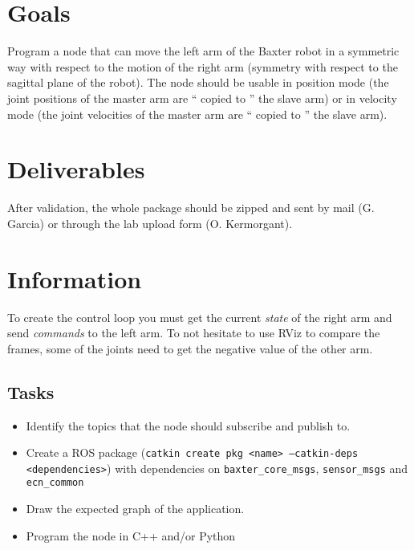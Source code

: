 \documentclass{ecnreport}
\author{G. Garcia, O. Kermorgant}
\begin{document}


\section{Goals}

Program a node that can move the left arm of the Baxter robot in a symmetric way with respect to
the motion of the right arm (symmetry with respect to the sagittal plane of the robot).
The node should be usable in position mode (the joint positions of the master arm are `` copied to ''
the slave arm) or in velocity mode (the joint velocities of the master arm are `` copied to '' the slave
arm).

\section{Deliverables}

After validation, the whole package should be zipped and sent by mail (G. Garcia) or through the lab upload form (O. Kermorgant).

\section{Information}

To create the control loop you must get the current \emph{state} of the right arm and send \emph{commands} to 
the left arm. To not hesitate to use RViz to compare the frames, some of the joints need to get the negative
value of the other arm.

\subsection{Tasks}

\begin{itemize}
\item Identify the topics that the node should subscribe and publish to.
 \item Create a ROS package (\texttt{catkin create pkg <name> --catkin-deps <dependencies>}) with dependencies on \texttt{baxter\_core\_msgs}, 
 \texttt{sensor\_msgs} and \texttt{ecn\_common}
 \item Draw the expected graph of the application. 
 \item Program the node in C++ and/or Python
 \end{itemize}
\end{document}
